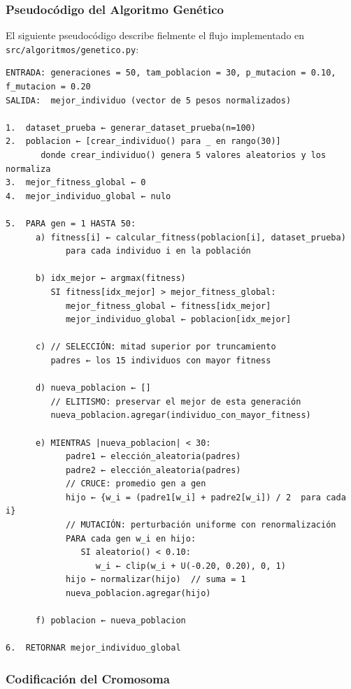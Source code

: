 \documentclass[11pt]{article}
\begin{document}
\subsubsection{Pseudocódigo del Algoritmo Genético}

El siguiente pseudocódigo describe fielmente el flujo implementado en \texttt{src/algoritmos/genetico.py}:

\begin{verbatim}
ENTRADA: generaciones = 50, tam_poblacion = 30, p_mutacion = 0.10, f_mutacion = 0.20
SALIDA:  mejor_individuo (vector de 5 pesos normalizados)

1.  dataset_prueba ← generar_dataset_prueba(n=100)
2.  poblacion ← [crear_individuo() para _ en rango(30)]
       donde crear_individuo() genera 5 valores aleatorios y los normaliza
3.  mejor_fitness_global ← 0
4.  mejor_individuo_global ← nulo

5.  PARA gen = 1 HASTA 50:
      a) fitness[i] ← calcular_fitness(poblacion[i], dataset_prueba)
            para cada individuo i en la población

      b) idx_mejor ← argmax(fitness)
         SI fitness[idx_mejor] > mejor_fitness_global:
            mejor_fitness_global ← fitness[idx_mejor]
            mejor_individuo_global ← poblacion[idx_mejor]

      c) // SELECCIÓN: mitad superior por truncamiento
         padres ← los 15 individuos con mayor fitness

      d) nueva_poblacion ← []
         // ELITISMO: preservar el mejor de esta generación
         nueva_poblacion.agregar(individuo_con_mayor_fitness)

      e) MIENTRAS |nueva_poblacion| < 30:
            padre1 ← elección_aleatoria(padres)
            padre2 ← elección_aleatoria(padres)
            // CRUCE: promedio gen a gen
            hijo ← {w_i = (padre1[w_i] + padre2[w_i]) / 2  para cada i}
            // MUTACIÓN: perturbación uniforme con renormalización
            PARA cada gen w_i en hijo:
               SI aleatorio() < 0.10:
                  w_i ← clip(w_i + U(-0.20, 0.20), 0, 1)
            hijo ← normalizar(hijo)  // suma = 1
            nueva_poblacion.agregar(hijo)

      f) poblacion ← nueva_poblacion

6.  RETORNAR mejor_individuo_global
\end{verbatim}

\subsubsection{Codificación del Cromosoma}
\end{document}
